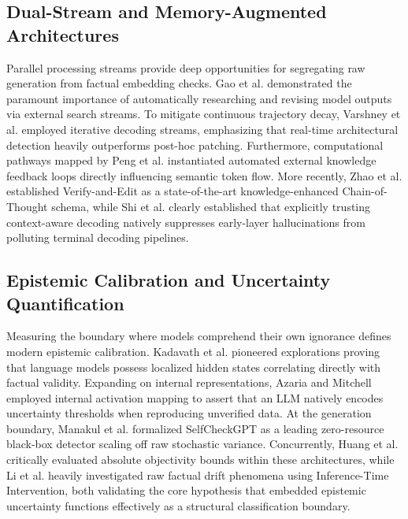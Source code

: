 \documentclass[10pt,journal,compsoc]{IEEEtran}
\begin{document}
\subsection{Dual-Stream and Memory-Augmented Architectures}
Parallel processing streams provide deep opportunities for segregating raw generation from factual embedding checks. Gao et al. \cite{ref24} demonstrated the paramount importance of automatically researching and revising model outputs via external search streams. To mitigate continuous trajectory decay, Varshney et al. \cite{ref21} employed iterative decoding streams, emphasizing that real-time architectural detection heavily outperforms post-hoc patching. Furthermore, computational pathways mapped by Peng et al. \cite{ref20} instantiated automated external knowledge feedback loops directly influencing semantic token flow. More recently, Zhao et al. \cite{ref19} established Verify-and-Edit as a state-of-the-art knowledge-enhanced Chain-of-Thought schema, while Shi et al. \cite{ref25} clearly established that explicitly trusting context-aware decoding natively suppresses early-layer hallucinations from polluting terminal decoding pipelines.

\subsection{Epistemic Calibration and Uncertainty Quantification}
Measuring the boundary where models comprehend their own ignorance defines modern epistemic calibration. Kadavath et al. \cite{ref9} pioneered explorations proving that language models possess localized hidden states correlating directly with factual validity. Expanding on internal representations, Azaria and Mitchell \cite{ref10} employed internal activation mapping to assert that an LLM natively encodes uncertainty thresholds when reproducing unverified data. At the generation boundary, Manakul et al. \cite{ref11} formalized SelfCheckGPT as a leading zero-resource black-box detector scaling off raw stochastic variance. Concurrently, Huang et al. \cite{ref17} critically evaluated absolute objectivity bounds within these architectures, while Li et al. \cite{ref18} heavily investigated raw factual drift phenomena using Inference-Time Intervention, both validating the core hypothesis that embedded epistemic uncertainty functions effectively as a structural classification boundary.
\end{document}
